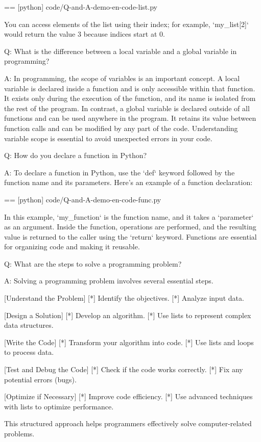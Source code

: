   == [python] {code/Q-and-A-demo-en-code-list.py}

  You can access elements of the list using their index; for example, `my\_list[2]` would return the value 3 because indices start at 0.

Q:
  What is the difference between a local variable and a global variable in programming?

A:
  In programming, the scope of variables is an important concept. A local variable is declared inside a function and is only accessible within that function. It exists only during the execution of the function, and its name is isolated from the rest of the program. In contrast, a global variable is declared outside of all functions and can be used anywhere in the program. It retains its value between function calls and can be modified by any part of the code. Understanding variable scope is essential to avoid unexpected errors in your code.

Q:
  How do you declare a function in Python?

A:
  To declare a function in Python, use the `def` keyword followed by the function name and its parameters. Here's an example of a function declaration:

  == [python] {code/Q-and-A-demo-en-code-func.py}

  In this example, `my\_function` is the function name, and it takes a `parameter` as an argument. Inside the function, operations are performed, and the resulting value is returned to the caller using the `return` keyword. Functions are essential for organizing code and making it reusable.

Q:
  What are the steps to solve a programming problem?

A:
  Solving a programming problem involves several essential steps.

  [Understand the Problem]
    [*] Identify the objectives.
    [*] Analyze input data.

  [Design a Solution]
    [*] Develop an algorithm.
    [*] Use lists to represent complex data structures.

  [Write the Code]
    [*] Transform your algorithm into code.
    [*] Use lists and loops to process data.

  [Test and Debug the Code]
    [*] Check if the code works correctly.
    [*] Fix any potential errors (bugs).

  [Optimize if Necessary]
    [*] Improve code efficiency.
    [*] Use advanced techniques with lists to optimize performance.

  This structured approach helps programmers effectively solve computer-related problems.
